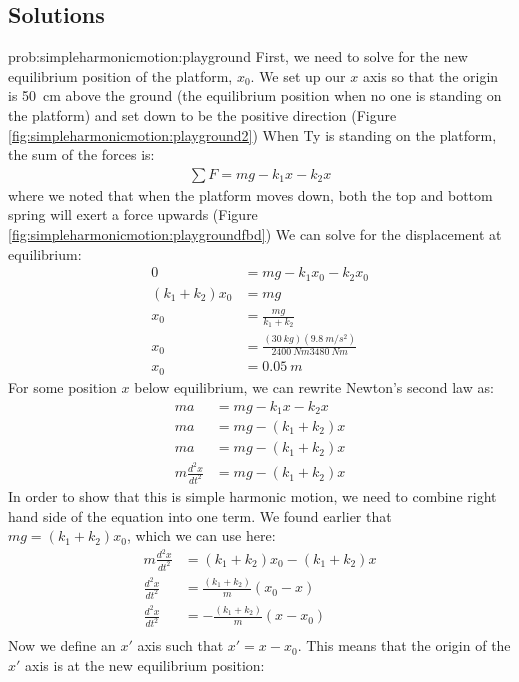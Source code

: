 \newpage
\subsection{Solutions}
\begin{solution}{prob:simpleharmonicmotion:playground}\label{soln:simpleharmonicmotion:playground}
First, we need to solve for the new equilibrium position of the platform, $x_0$. We set up our $x$ axis so that the origin is \SI{50}{cm} above the ground (the equilibrium position when no one is standing on the platform) and set down to be the positive direction (Figure \ref{fig:simpleharmonicmotion:playground2})
When Ty is standing on the platform, the sum of the forces is:
\begin{align*}
\sum F=mg-k_1x-k_2x
\end{align*}
where we noted that when the platform moves down, both the top and bottom spring will exert a force upwards (Figure \ref{fig:simpleharmonicmotion:playgroundfbd}) We can solve for the displacement at equilibrium:
\begin{align*}
0&=mg-k_1x_0-k_2x_0\\
(k_1+k_2)x_0&=mg\\
x_0&=\frac{mg}{k_1+k_2}\\
x_0&=\frac{(\SI{30}{kg})(\SI{9.8}{m/s^2})}{\SI{2400}{Nm}\SI{3480}{Nm}}\\
x_0&=\SI{0.05}{m}
\end{align*}
For some position $x$ below equilibrium, we can rewrite Newton's second law as:
\begin{align*}
ma&=mg-k_1x-k_2x\\
ma&=mg-(k_1+k_2)x\\
ma&=mg-(k_1+k_2)x\\
m\frac{d^2x}{dt^2}&=mg-(k_1+k_2)x
\end{align*}
In order to show that this is simple harmonic motion, we need to combine right hand side of the equation into one term. We found earlier that $mg=(k_1+k_2)x_0$, which we can use here:
\begin{align*}
m\frac{d^2x}{dt^2}&=(k_1+k_2)x_0-(k_1+k_2)x\\
\frac{d^2x}{dt^2}&=\frac{(k_1+k_2)}{m}(x_0-x)\\
\frac{d^2x}{dt^2}&=-\frac{(k_1+k_2)}{m}(x-x_0)\\
\end{align*}
Now we define an $x'$ axis such that $x'=x-x_0$. This means that the origin of the $x'$ axis is at the new equilibrium position:

\end{solution}
